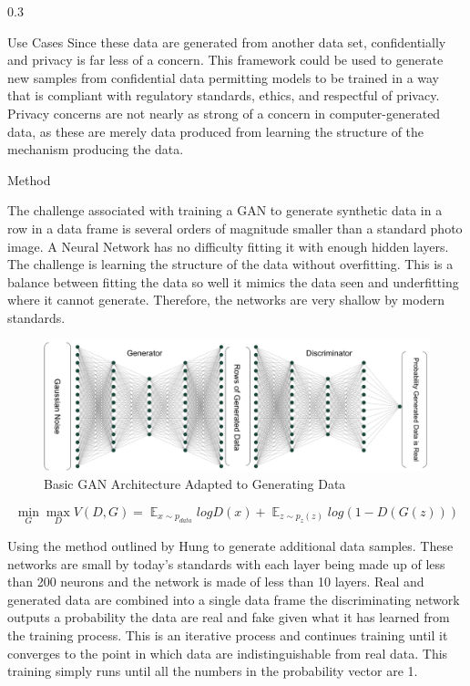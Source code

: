 \documentclass{msuposter}
\newcommand{\colwidth}{0.3\linewidth}
\begin{document}
\begin{frame}{}
\begin{columns}[t]
\begin{column}{\colwidth}
\begin{block}{Use Cases}
Since these data are generated from another data set, confidentially and privacy is far less of a concern. This framework could be used to generate new samples from confidential data permitting models to be trained in a way that is compliant with regulatory standards, ethics, and respectful of privacy. Privacy concerns are not nearly as strong of a concern in computer-generated data, as these are merely data produced from learning the structure of the mechanism producing the data. 

\end{block}

\begin{block}{Method}

The challenge associated with training a GAN to generate synthetic data in a row in a data frame is several orders of magnitude smaller than a standard photo image. A Neural Network has no difficulty fitting it with enough hidden layers. The challenge is learning the structure of the data without overfitting. This is a balance between fitting the data so well it mimics the data seen and underfitting where it cannot generate. Therefore, the networks are very shallow by modern standards. 


\begin{figure}
  \includegraphics[width=\linewidth]{gan_diag.png}
    	\caption{\label{fig:my-label} Basic GAN Architecture Adapted to Generating Data}
\end{figure}

$$
\min_{G} \max_{D} V(D, G) = \mathop{\mathbb{E}}_{x \sim p_{data}} logD(x) + \mathop{\mathbb{E}}_{z \sim p_{z}(z)}log(1-D(G(z)))
$$

Using the method outlined by Hung \cite{hung} to generate additional data samples. These networks are small by today's standards with each layer being made up of less than 200 neurons and the network is made of less than 10 layers. Real and generated data are combined into a single data frame the discriminating network outputs a probability the data are real and fake given what it has learned from the training process. This is an iterative process and continues training until it converges to the point in which data are indistinguishable from real data. This training simply runs until all the numbers in the probability vector are 1.



\end{block}
\end{column}
\end{columns}
\end{frame}
\end{document}
